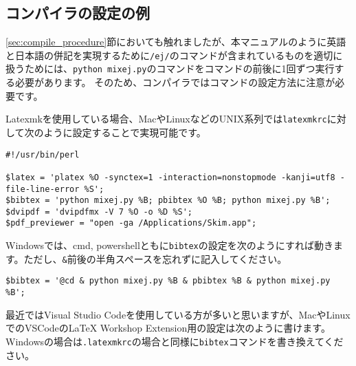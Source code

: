 \documentclass[10pt, a4paper]{jsarticle}
\begin{document}
\subsection{コンパイラの設定の例}
\label{sec:compile_config}

\ref{sec:compile_procedure}節においても触れましたが、本マニュアルのように英語と日本語の併記を実現するために\texttt{/ej/}のコマンドが含まれているものを適切に扱うためには、\texttt{python mixej.py}のコマンドを\BibTeX コマンドの前後に1回ずつ実行する必要があります。
そのため、コンパイラでは\BibTeX コマンドの設定方法に注意が必要です。

Latexmkを使用している場合、MacやLinuxなどのUNIX系列では\texttt{latexmkrc}に対して次のように設定することで実現可能です。

\noindent\makebox[\linewidth]{\rule{\linewidth}{0.4pt}}\vspace{-0.5zw}
\begin{lstlisting}[style=onecol]
#!/usr/bin/perl

$latex = 'platex %O -synctex=1 -interaction=nonstopmode -kanji=utf8 -file-line-error %S';
$bibtex = 'python mixej.py %B; pbibtex %O %B; python mixej.py %B';
$dvipdf = 'dvipdfmx -V 7 %O -o %D %S';
$pdf_previewer = "open -ga /Applications/Skim.app";
\end{lstlisting}\vspace{-1.8zw}
\noindent\makebox[\linewidth]{\rule{\linewidth}{0.4pt}}\vspace{0.5zw}\par

\noindent
Windowsでは、cmd, powershellともに\texttt{bibtex}の設定を次のようにすれば動きます。ただし、\texttt{\&}前後の半角スペースを忘れずに記入してください。

\noindent\makebox[\linewidth]{\rule{\linewidth}{0.4pt}}\vspace{-0.5zw}
\begin{lstlisting}[style=onecol]
$bibtex = '@cd & python mixej.py %B & pbibtex %B & python mixej.py %B';
\end{lstlisting}\vspace{-1.8zw}
\noindent\makebox[\linewidth]{\rule{\linewidth}{0.4pt}}\vspace{0.5zw}\par


最近ではVisual Studio Codeを使用している方が多いと思いますが、MacやLinuxでのVSCodeのLaTeX Workshop Extension用の設定は次のように書けます。Windowsの場合は\texttt{.latexmkrc}の場合と同様に\texttt{bibtex}コマンドを書き換えてください。
\end{document}
